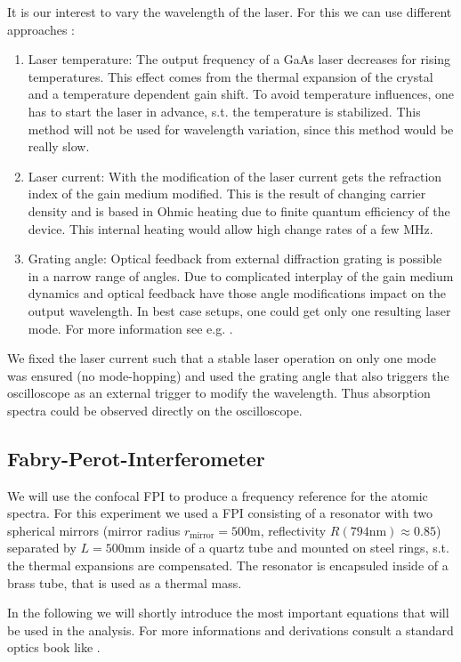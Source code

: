 \documentclass[11pt,a4paper,notitlepage]{scrartcl}
\begin{document}
It is our interest to vary the wavelength of the laser. For this we can use different approaches \cite{manual}:
\begin{enumerate}
	\item Laser temperature: The output frequency of a GaAs laser decreases for rising temperatures. This effect comes from the thermal expansion of the crystal and a temperature dependent gain shift. To avoid temperature influences, one has to start the laser in advance, s.t. the temperature is stabilized. This method will not be used for wavelength variation, since this method would be really slow. 
	\item Laser current: With the modification of the laser current gets the refraction index of the gain medium modified. This is the result of changing carrier density and is based in Ohmic heating due to finite quantum efficiency of the device. This internal heating would allow high change rates of a few MHz.
	\item Grating angle: Optical feedback from external diffraction grating is possible in a narrow range of angles. Due to complicated interplay of the gain medium dynamics and optical feedback have those angle modifications impact on the output wavelength. In best case setups, one could get only one resulting laser mode. For more information see e.g. {\cite{grating}}.
\end{enumerate} 
We fixed the laser current such that a stable laser operation on only one mode was ensured (no mode-hopping) and used the grating angle that also triggers the oscilloscope as an external trigger to modify the wavelength. Thus absorption spectra could be observed directly on the oscilloscope.  

\subsection{Fabry-Perot-Interferometer}
We will use the confocal FPI to produce a frequency reference for the atomic spectra. For this experiment we used a FPI consisting of a resonator with two spherical mirrors (mirror radius $r_\text{mirror}=500$m, reflectivity $R(794\text{nm})\approx0.85$) separated by $L=500$mm inside of a quartz tube and mounted on steel rings, s.t. the thermal expansions are compensated. The resonator is encapsuled inside of a brass tube, that is used as a thermal mass. \cite{manual}
 
 In the following we will shortly introduce the most important equations that will be used in the analysis. For more informations and derivations consult a standard optics book like \cite{hecht}. 
 
\end{document}
